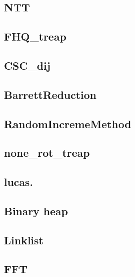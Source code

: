\subsection{NTT}
\raggedbottom
\hrulefill

\subsection{FHQ\_treap}
\raggedbottom
\hrulefill

\subsection{CSC\_dij}
\raggedbottom
\hrulefill

\subsection{BarrettReduction}
\raggedbottom
\hrulefill

\subsection{RandomIncremeMethod}
\raggedbottom
\hrulefill

\subsection{none\_rot\_treap}
\raggedbottom
\hrulefill

\subsection{lucas.}
\raggedbottom
\hrulefill

\subsection{Binary heap}
\raggedbottom
\hrulefill

\subsection{Linklist}
\raggedbottom
\hrulefill

\subsection{FFT}
\raggedbottom
\hrulefill

